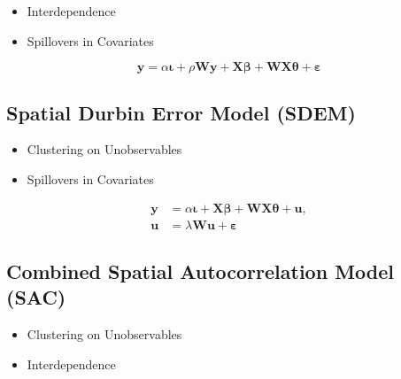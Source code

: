 \documentclass[
  letterpaper,
  DIV=11,
  numbers=noendperiod]{scrreprt}
\providecommand{\tightlist}{%
  \setlength{\itemsep}{0pt}\setlength{\parskip}{0pt}}\usepackage{longtable,booktabs,array}
\begin{document}
\begin{itemize}
\tightlist
\item
  Interdependence
\item
  Spillovers in Covariates
\end{itemize}

\[
        \begin{equation}
        {\boldsymbol{\mathbf{y}}}=\alpha{\boldsymbol{\mathbf{\iota}}}+\rho{\boldsymbol{\mathbf{W}}}{\boldsymbol{\mathbf{y}}}+{\boldsymbol{\mathbf{X}}}{\boldsymbol{\mathbf{\beta}}}+{\boldsymbol{\mathbf{W}}}{\boldsymbol{\mathbf{X}}}{\boldsymbol{\mathbf{\theta}}}+ {\boldsymbol{\mathbf{\varepsilon}}}
        \end{equation}
\]

\hypertarget{spatial-durbin-error-model-sdem}{%
\subsection{Spatial Durbin Error Model
(SDEM)}\label{spatial-durbin-error-model-sdem}}

\begin{itemize}
\tightlist
\item
  Clustering on Unobservables
\item
  Spillovers in Covariates
\end{itemize}

\[
    \begin{equation}
        \begin{split}
        {\boldsymbol{\mathbf{y}}}&=\alpha{\boldsymbol{\mathbf{\iota}}}+{\boldsymbol{\mathbf{X}}}{\boldsymbol{\mathbf{\beta}}}+{\boldsymbol{\mathbf{W}}}{\boldsymbol{\mathbf{X}}}{\boldsymbol{\mathbf{\theta}}}+ {\boldsymbol{\mathbf{u}}},\\
        {\boldsymbol{\mathbf{u}}}&=\lambda{\boldsymbol{\mathbf{W}}}{\boldsymbol{\mathbf{u}}}+{\boldsymbol{\mathbf{\varepsilon}}}
        \end{split}
        \end{equation}
\]

\hypertarget{combined-spatial-autocorrelation-model-sac}{%
\subsection{Combined Spatial Autocorrelation Model
(SAC)}\label{combined-spatial-autocorrelation-model-sac}}

\begin{itemize}
\tightlist
\item
  Clustering on Unobservables
\item
  Interdependence
\end{itemize}
\end{document}
